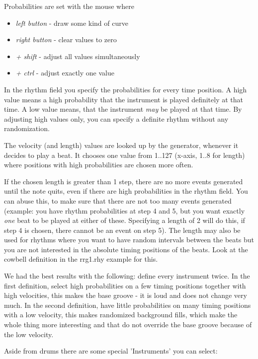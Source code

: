 \documentclass[letterpaper]{report}
\begin{document}
Probabilities are set with the mouse where

\begin{itemize}
\item {\em left button} - draw some kind of curve
\item {\em right button} - clear values to zero
\item {\em + shift} - adjust all values simultaneously
\item {\em + ctrl} - adjust exactly one value
\end{itemize}

In the rhythm field you specify the probabilities for every time
position. A high value means a high probability that the instrument is
played definitely at that time. A low value means, that the instrument
{\em may} be played at that time. By adjusting high values only, you
can specify a definite rhythm without any randomization.

The velocity (and length) values are looked up by the generator, whenever
it decides to play a beat.  It chooses one value from 1..127 (x-axis,
1..8 for length) where positions with high probabilities are chosen more
often.

If the chosen length is greater than 1 step, there are no more events
generated until the note quits, even if there are high probabilities in the
rhythm field. You can abuse this, to make sure that there are not too many
events generated (example: you have rhythm probabilities at step 4 and 5,
but you want exactly {\em one} beat to be played at either of these.
Specifying a length of 2 will do this,  if step 4 is chosen, there cannot
be an event on step 5). The length may also be used for rhythms where you
want to have random intervals between the beats but you are not interested
in the absolute timing positions of the beats. Look at the cowbell definition
in the rrg1.rhy example for this.

We had the best results with the following: define every instrument
twice. In the first definition, select high probabilities on a few
timing positions together with high velocities, this makes the base
groove - it is loud and does not change very much. In the second
definition, have little probabilities on many timing positions with
a low velocity, this makes randomized background fills, which make the
whole thing more interesting and that do not override the base groove
because of the low velocity.

Aside from drums there are some special 'Instruments' you can select:
\end{document}
